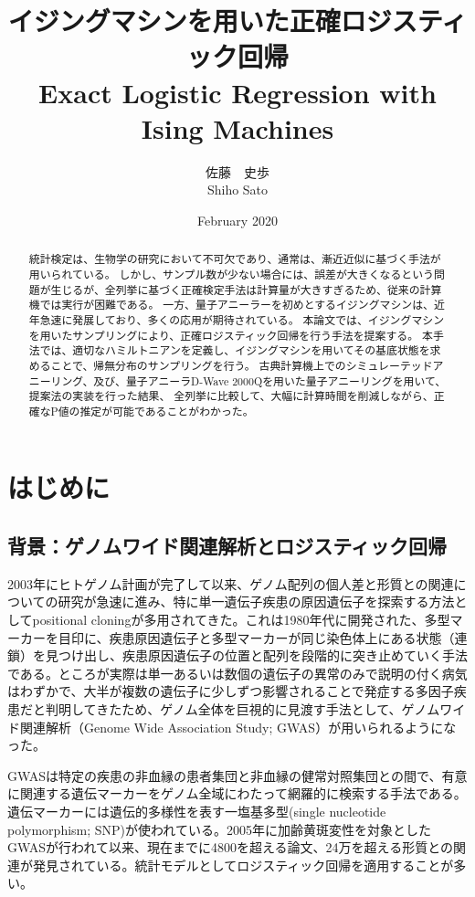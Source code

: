 \documentclass[12pt, dvipdfmx]{jmaster}
\title{イジングマシンを用いた正確ロジスティック回帰\\
Exact Logistic Regression with Ising Machines}
\author{佐藤　史歩\\ Shiho Sato}
\date{February 2020}
\theoremstyle{definition}
\begin{document}
\maketitle

\begin{abstract}
	統計検定は、生物学の研究において不可欠であり、通常は、漸近近似に基づく手法が用いられている。
	しかし、サンプル数が少ない場合には、誤差が大きくなるという問題が生じるが、全列挙に基づく正確検定手法は計算量が大きすぎるため、従来の計算機では実行が困難である。
	一方、量子アニーラーを初めとするイジングマシンは、近年急速に発展しており、多くの応用が期待されている。
	本論文では、イジングマシンを用いたサンプリングにより、正確ロジスティック回帰を行う手法を提案する。
	本手法では、適切なハミルトニアンを定義し、イジングマシンを用いてその基底状態を求めることで、帰無分布のサンプリングを行う。
	古典計算機上でのシミュレーテッドアニーリング、及び、量子アニーラD-Wave 2000Qを用いた量子アニーリングを用いて、提案法の実装を行った結果、
	全列挙に比較して、大幅に計算時間を削減しながら、正確なP値の推定が可能であることがわかった。
\end{abstract}
\newpage
\tableofcontents
\newpage

\chapter{はじめに} 
\label{sec:intro}
\section{背景：ゲノムワイド関連解析とロジスティック回帰}
2003年にヒトゲノム計画が完了して以来、ゲノム配列の個人差と形質との関連についての研究が急速に進み、特に単一遺伝子疾患の原因遺伝子を探索する方法としてpositional cloningが多用されてきた。これは1980年代に開発された、多型マーカーを目印に、疾患原因遺伝子と多型マーカーが同じ染色体上にある状態（連鎖）を見つけ出し、疾患原因遺伝子の位置と配列を段階的に突き止めていく手法である\cite{yano2016genome}。ところが実際は単一あるいは数個の遺伝子の異常のみで説明の付く病気はわずかで、大半が複数の遺伝子に少しずつ影響されることで発症する多因子疾患だと判明してきたため、ゲノム全体を巨視的に見渡す手法として、ゲノムワイド関連解析（Genome Wide Association Study; GWAS）が用いられるようになった。

GWASは特定の疾患の非血縁の患者集団と非血縁の健常対照集団との間で、有意に関連する遺伝マーカーをゲノム全域にわたって網羅的に検索する手法である\cite{yano2016genome}。遺伝マーカーには遺伝的多様性を表す一塩基多型(single nucleotide polymorphism; SNP)が使われている。2005年に加齢黄斑変性を対象としたGWASが行われて以来、現在までに4800を超える論文、24万を超える形質との関連が発見されている\cite{gwasCatalog}。統計モデルとしてロジスティック回帰を適用することが多い\cite{duverle2015privacy}。
\end{document}
